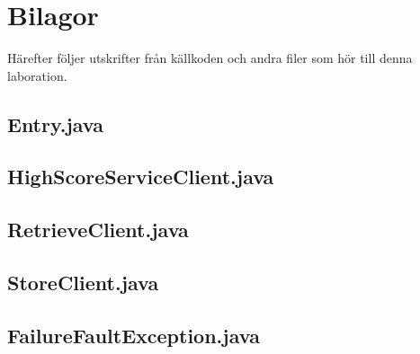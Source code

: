 \documentclass[a4paper, 12pt]{article}
\begin{document}




\newpage
\appendix
{}
\section{Bilagor}\label{Bilagor}
Härefter följer utskrifter från källkoden och andra filer som hör till
denna laboration.

\newpage
\subsection{Entry.java}\label{Entry.java}
\begin{footnotesize}
  
\end{footnotesize}

\newpage
\subsection{HighScoreServiceClient.java}\label{HighScoreServiceClient.java}
\begin{footnotesize}
  
\end{footnotesize}

\newpage
\subsection{RetrieveClient.java}\label{RetrieveClient.java}
\begin{footnotesize}
  
\end{footnotesize}

\newpage
\subsection{StoreClient.java}\label{StoreClient.java}
\begin{footnotesize}
  
\end{footnotesize}

\newpage
\subsection{FailureFaultException.java}\label{FailureFaultException.java}
\begin{footnotesize}
  
\end{footnotesize}
\end{document}

